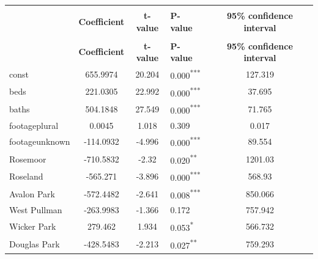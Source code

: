 \documentclass[12pt]{report}
\begin{document}
\begin{longtable}{l S[table-format=6.4] S[table-format=3.4] l S[table-format=4.4]}
	\toprule \\
	                             & \textbf{Coefficient} & \textbf{t-value} & \textbf{P-value}           & \textbf{95\% confidence interval} \\ \midrule
	\endfirsthead\toprule \\
	                             & \textbf{Coefficient} & \textbf{t-value} & \textbf{P-value}           & \textbf{95\% confidence interval} \\\midrule\endhead
	const                        & 655.9974             & 20.204           & 0.000\textsuperscript{***} & 127.319                           \\
	beds                         & 221.0305             & 22.992           & 0.000\textsuperscript{***} & 37.695                            \\
	baths                        & 504.1848             & 27.549           & 0.000\textsuperscript{***} & 71.765                            \\
	footageplural                & 0.0045               & 1.018            & 0.309                      & 0.017                             \\
	footageunknown               & -114.0932            & -4.996           & 0.000\textsuperscript{***} & 89.554                            \\
	Rosemoor                     & -710.5832            & -2.32            & 0.020\textsuperscript{**}  & 1201.03                           \\
	Roseland                     & -565.271             & -3.896           & 0.000\textsuperscript{***} & 568.93                            \\
	Avalon Park                  & -572.4482            & -2.641           & 0.008\textsuperscript{***} & 850.066                           \\
	West Pullman                 & -263.9983            & -1.366           & 0.172                      & 757.942                           \\
	Wicker Park                  & 279.462              & 1.934            & 0.053\textsuperscript{*}   & 566.732                           \\
	Douglas Park                 & -428.5483            & -2.213           & 0.027\textsuperscript{**}  & 759.293                           \\

\end{longtable}
\end{document}
